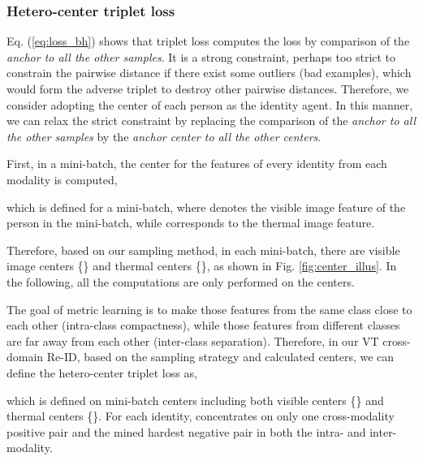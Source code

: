 \documentclass[journal]{IEEEtran}
\begin{document}
\subsubsection{Hetero-center triplet loss} Eq. (\ref{eq:loss_bh}) shows that triplet loss computes the loss by comparison of the \emph{anchor to all the other samples}. It is a strong constraint, perhaps too strict to constrain the pairwise distance if there exist some outliers (bad examples), which would form the adverse triplet to destroy other pairwise distances. Therefore, we consider adopting the center of each person as the identity agent. In this manner, we can relax the strict constraint by replacing the comparison of the \emph{anchor to all the other samples} by the \emph{anchor center to all the other centers}.

First, in a mini-batch, the center for the features of every identity from each modality is computed,

which is defined for a mini-batch, where  denotes the  visible image feature of the  person in the mini-batch, while  corresponds to the thermal image feature.

Therefore, based on our  sampling method, in each mini-batch, there are  visible image centers \{\} and  thermal centers \{\}, as shown in Fig. \ref{fig:center_illus}. In the following, all the computations are only performed on the centers.

The goal of metric learning is to make those features from the same class close to each other (intra-class compactness), while those features from different classes are far away from each other (inter-class separation). Therefore, in our VT cross-domain Re-ID, based on the  sampling strategy and calculated centers, we can define the hetero-center triplet loss as,

which is defined on mini-batch centers  including both visible centers \{\} and thermal centers \{\}.
For each identity,  concentrates on only one cross-modality positive pair and the mined hardest negative pair in both the intra- and inter-modality.
\end{document}
